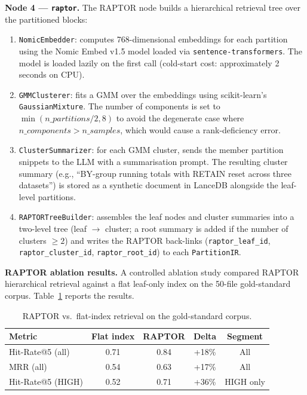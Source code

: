 \textbf{Node 4 --- \texttt{raptor}.} The RAPTOR node builds a hierarchical
retrieval tree over the partitioned blocks:

\begin{enumerate}
  \item \texttt{NomicEmbedder}: computes 768-dimensional embeddings for each
    partition using the Nomic Embed v1.5 model loaded via
    \texttt{sentence-transformers}. The model is loaded lazily on the first
    call (cold-start cost: approximately 2 seconds on CPU).
  \item \texttt{GMMClusterer}: fits a \ac{GMM} over the embeddings using
    scikit-learn's \texttt{GaussianMixture}. The number of components is
    set to $\min(n\_partitions / 2, 8)$ to avoid the degenerate case where
    $n\_components > n\_samples$, which would cause a rank-deficiency error.
  \item \texttt{ClusterSummarizer}: for each GMM cluster, sends the member
    partition snippets to the LLM with a summarisation prompt. The resulting
    cluster summary (e.g., ``BY-group running totals with RETAIN reset across
    three datasets'') is stored as a synthetic document in LanceDB alongside
    the leaf-level partitions.
  \item \texttt{RAPTORTreeBuilder}: assembles the leaf nodes and cluster
    summaries into a two-level tree (leaf $\rightarrow$ cluster; a root summary
    is added if the number of clusters $\geq 2$) and writes the RAPTOR back-links
    (\texttt{raptor\_leaf\_id}, \texttt{raptor\_cluster\_id},
    \texttt{raptor\_root\_id}) to each \texttt{PartitionIR}.
\end{enumerate}

\textbf{RAPTOR ablation results.} A controlled ablation study compared RAPTOR
hierarchical retrieval against a flat leaf-only index on the 50-file gold-standard
corpus. Table~\ref{tab:raptor-ablation-ch4} reports the results.

\begin{table}[h]
\centering
\caption{RAPTOR vs.\ flat-index retrieval on the gold-standard corpus.}
\label{tab:raptor-ablation-ch4}
\begin{tabular}{lcccc}
\hline
\textbf{Metric} & \textbf{Flat index} & \textbf{RAPTOR} & \textbf{Delta} & \textbf{Segment} \\
\hline
Hit-Rate@5 (all)     & 0.71 & 0.84 & +18\% & All \\
MRR (all)            & 0.54 & 0.63 & +17\% & All \\
Hit-Rate@5 (HIGH)    & 0.52 & 0.71 & +36\% & HIGH only \\
\hline
\end{tabular}
\end{table}

